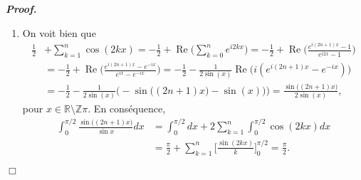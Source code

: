 \documentclass[11pt,a4paper]{article}
\newcommand{\RR}{\mathbb{R}}
\newenvironment{preuve}[1][]
{\vskip 2mm  \noindent\emph{\bf Proof#1. }}{$\Box$ \vskip 2mm}
\newcommand{\Z}{\mathbb{Z}}
\begin{document}
	\begin{preuve}
		\begin{enumerate} 
			\item On voit bien que 
			\begin{align*}
			\frac{1}{2} &+ \sum_{k=1}^{n}\cos (2kx) 
			= - \frac{1}{2} + \operatorname{Re}\bigg( \sum_{k=0}^{n}  e^{i 2 k x} \bigg) 
			=  - \frac{1}{2} + \operatorname{Re}\bigg( \frac{e^{i (2 n+1) x}-1}{e^{i 2 x}-1} \bigg)
			\\
			&= - \frac{1}{2} + \operatorname{Re}\bigg( \frac{e^{i (2 n+1) x} - e^{-i  x }}{e^{i  x }- e^{-i x}} \bigg) 
			= - \frac{1}{2} - \frac{1}{2 \sin(x)} \operatorname{Re}\bigg( i(e^{i (2 n+1) x} - e^{-i  x }) \bigg)     
			\\
			&=- \frac{1}{2} - \frac{1}{2 \sin(x)} \Big( -\sin\big((2n+1)x\big) - \sin(x)) \Big) = \frac{\sin \big((2n+1)x\big) }{ 2 \sin (x)},
			\end{align*}
			pour $x \in \RR \setminus \Z \pi$. 
			En conséquence, 
			\begin{align*} 
			\int_0^{\pi/2} \frac{\sin \big((2n+1)x\big) }{\sin x}dx &= \int_0^{\pi/2} dx + 2 \sum_{k=1}^{n} \int_0^{\pi/2}\cos (2kx)  dx 
			\\
			&= \frac{\pi }{2} + \sum_{k=1}^{n} \bigg[ \frac{\sin(2kx)}{k} \bigg]_0^{\pi/2} = \frac{\pi }{2}.     
			\end{align*}
			

\end{enumerate}
\end{preuve}
\end{document}
